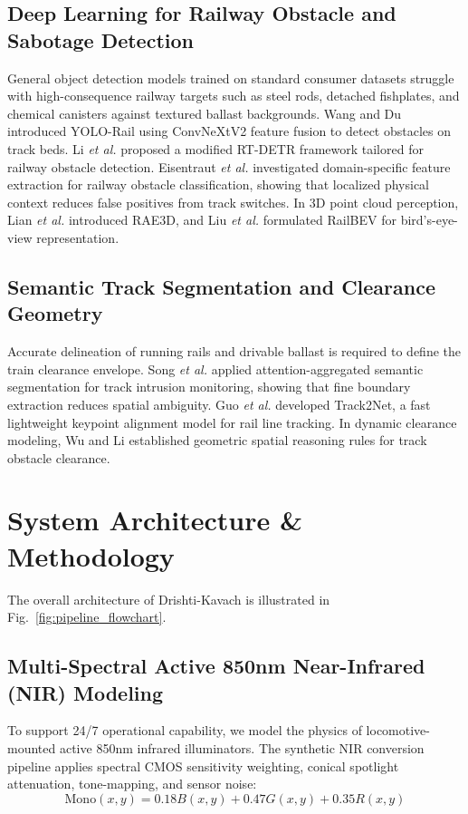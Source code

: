 \documentclass[conference]{IEEEtran}
\begin{document}
\subsection{Deep Learning for Railway Obstacle and Sabotage Detection}
General object detection models trained on standard consumer datasets struggle with high-consequence railway targets such as steel rods, detached fishplates, and chemical canisters against textured ballast backgrounds. Wang and Du \cite{wang2024yolorail} introduced YOLO-Rail using ConvNeXtV2 feature fusion to detect obstacles on track beds. Li \textit{et al.} \cite{li2025improved} proposed a modified RT-DETR framework tailored for railway obstacle detection. Eisentraut \textit{et al.} \cite{eisentraut2025leveraging} investigated domain-specific feature extraction for railway obstacle classification, showing that localized physical context reduces false positives from track switches. In 3D point cloud perception, Lian \textit{et al.} \cite{lian2025rae3d} introduced RAE3D, and Liu \textit{et al.} \cite{liu2025railbev} formulated RailBEV for bird's-eye-view representation.

\subsection{Semantic Track Segmentation and Clearance Geometry}
Accurate delineation of running rails and drivable ballast is required to define the train clearance envelope. Song \textit{et al.} \cite{song2025deep} applied attention-aggregated semantic segmentation for track intrusion monitoring, showing that fine boundary extraction reduces spatial ambiguity. Guo \textit{et al.} \cite{guo2026track2net} developed Track2Net, a fast lightweight keypoint alignment model for rail line tracking. In dynamic clearance modeling, Wu and Li \cite{wu2025research} established geometric spatial reasoning rules for track obstacle clearance.

\section{System Architecture \& Methodology}

The overall architecture of Drishti-Kavach is illustrated in Fig.~\ref{fig:pipeline_flowchart}.

\subsection{Multi-Spectral Active 850nm Near-Infrared (NIR) Modeling}
To support 24/7 operational capability, we model the physics of locomotive-mounted active 850nm infrared illuminators. The synthetic NIR conversion pipeline applies spectral CMOS sensitivity weighting, conical spotlight attenuation, tone-mapping, and sensor noise:
\begin{equation}
\text{Mono}(x,y) = 0.18 B(x,y) + 0.47 G(x,y) + 0.35 R(x,y)
\end{equation}
\end{document}
